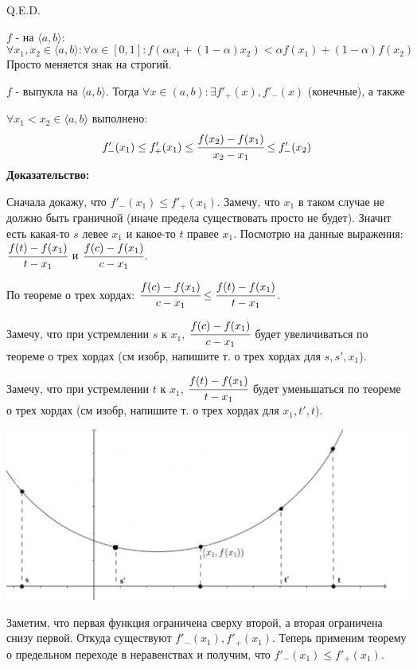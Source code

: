 \hfill Q.E.D.

$f$ -  на $\langle a,b\rangle$:
$$\forall x_1,x_2 \in \langle a,b \rangle: \forall \alpha \in[0,1]:f(\alpha x_1+(1-\alpha)x_2)< \alpha f(x_1) + (1-\alpha) f(x_2)$$
Просто меняется знак на строгий.


$f$ - выпукла на $\langle a,b \rangle$. Тогда $\forall x\in( a,b): \exists f'_+(x), f'_-(x)$ (конечные),  а также

$\forall x_1<x_2\in \langle a,b\rangle$ выполнено:
$$f'_-(x_1)\leq f'_+(x_1) \leq \cfrac{f(x_2)-f(x_1)}{x_2-x_1}\leq f'_-(x_2)$$
\textbf{Доказательство:}

Сначала докажу, что $f'_-(x_1)\leq f'_+(x_1)$. Замечу, что $x_1$ в таком случае не должно быть граничной (иначе предела существовать просто не будет). Значит есть какая-то $s$ левее $x_1$ и какое-то $t$ правее $x_1$. Посмотрю на данные выражения:
$\cfrac{f(t)-f(x_1)}{t-x_1}$ и $\cfrac{f(c)-f(x_1)}{c-x_1}$. 

По теореме о трех хордах: $\cfrac{f(c)-f(x_1)}{c-x_1} \leq \cfrac{f(t)-f(x_1)}{t-x_1}$.

Замечу, что при устремлении $s$ к $x_1$,  $\cfrac{f(c)-f(x_1)}{c-x_1}$ будет увеличиваться по теореме о трех хордах (см изобр, напишите т. о трех хордах для $s,s',x_1$).

Замечу, что при устремлении $t$ к $x_1$,  $\cfrac{f(t)-f(x_1)}{t-x_1}$ будет  уменьшаться по теореме о трех хордах (см изобр, напишите т. о трех хордах для $x_1,t',t$).


\begin{center}
 \includegraphics[width = 15cm]{assets/integral_1.png}
\end{center}

Заметим, что первая функция ограничена сверху второй, а вторая ограничена снизу первой. Откуда существуют  $f'_-(x_1), f'_+(x_1)$. Теперь применим теорему о предельном переходе в неравенствах и получим, что $f'_-(x_1)\leq f'_+(x_1)$.

